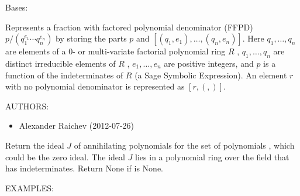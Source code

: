 \documentclass[letterpaper,12pt,openany,oneside]{sphinxmanual}
\begin{document}
\begin{fulllineitems}
\label{amgf:amgf.FFPD}
Bases: 

Represents a fraction with factored polynomial denominator (FFPD)
$p/(q_1^{e_1} \cdots q_n^{e_n})$ by storing the parts $p$ and
$[(q_1, e_1), \ldots, (q_n, e_n)]$.
Here $q_1, \ldots, q_n$ are elements of a 0- or multi-variate factorial
polynomial ring $R$ , $q_1, \ldots, q_n$ are distinct irreducible elements
of $R$ , $e_1, \ldots, e_n$ are positive integers, and $p$ is a function
of the indeterminates of $R$ (a Sage Symbolic Expression).
An element $r$ with no polynomial denominator is represented as $[r, (,)]$.

AUTHORS:
\begin{itemize}
\item {} 
Alexander Raichev (2012-07-26)

\end{itemize}

\begin{fulllineitems}
\label{amgf:amgf.FFPD.algebraic_dependence_certificate}
Return the ideal $J$ of annihilating polynomials for the set
of polynomials ,
which could be the zero ideal.
The ideal $J$ lies in a polynomial ring over the field
 that has
 indeterminates.
Return None if  is None.

EXAMPLES:


\end{fulllineitems}
\end{fulllineitems}
\end{document}
